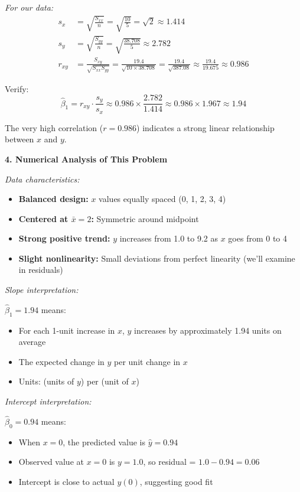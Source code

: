 \documentclass[12pt]{article}
\begin{document}
\begin{explanation}
\textit{For our data:}
\begin{align*}
s_x &= \sqrt{\frac{S_{xx}}{n}} = \sqrt{\frac{10}{5}} = \sqrt{2} \approx 1.414 \\
s_y &= \sqrt{\frac{S_{yy}}{n}} = \sqrt{\frac{38.708}{5}} \approx 2.782 \\
r_{xy} &= \frac{S_{xy}}{\sqrt{S_{xx}S_{yy}}} = \frac{19.4}{\sqrt{10 \times 38.708}} = \frac{19.4}{\sqrt{387.08}} \approx \frac{19.4}{19.675} \approx 0.986
\end{align*}

Verify:
\[
\hat{\beta}_1 = r_{xy} \cdot \frac{s_y}{s_x} \approx 0.986 \times \frac{2.782}{1.414} \approx 0.986 \times 1.967 \approx 1.94
\]

The very high correlation ($r = 0.986$) indicates a strong linear relationship between $x$ and $y$.

\textbf{4. Numerical Analysis of This Problem}

\textit{Data characteristics:}

\begin{itemize}
    \item \textbf{Balanced design:} $x$ values equally spaced (0, 1, 2, 3, 4)
    \item \textbf{Centered at $\bar{x} = 2$:} Symmetric around midpoint
    \item \textbf{Strong positive trend:} $y$ increases from 1.0 to 9.2 as $x$ goes from 0 to 4
    \item \textbf{Slight nonlinearity:} Small deviations from perfect linearity (we'll examine in residuals)
\end{itemize}

\textit{Slope interpretation:}

$\hat{\beta}_1 = 1.94$ means:
\begin{itemize}
    \item For each 1-unit increase in $x$, $y$ increases by approximately 1.94 units on average
    \item The expected change in $y$ per unit change in $x$
    \item Units: (units of $y$) per (unit of $x$)
\end{itemize}

\textit{Intercept interpretation:}

$\hat{\beta}_0 = 0.94$ means:
\begin{itemize}
    \item When $x = 0$, the predicted value is $\hat{y} = 0.94$
    \item Observed value at $x = 0$ is $y = 1.0$, so residual = $1.0 - 0.94 = 0.06$
    \item Intercept is close to actual $y(0)$, suggesting good fit
\end{itemize}


\end{explanation}
\end{document}
